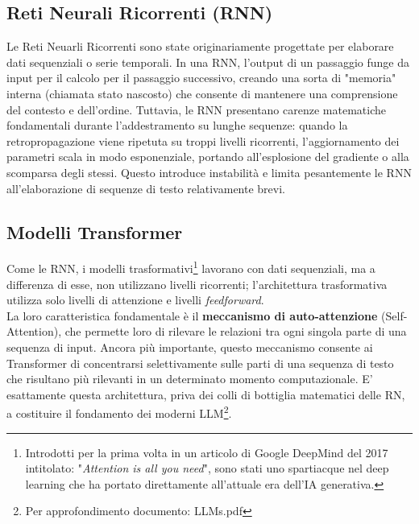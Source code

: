 \documentclass{article}
\begin{document}
\subsection{Reti Neurali Ricorrenti (RNN)}
Le Reti Neuarli Ricorrenti sono state originariamente progettate per elaborare dati sequenziali o serie temporali. In una RNN, l'output di un passaggio funge da input per il calcolo per il passaggio successivo, creando una sorta di "memoria" interna (chiamata stato nascosto) che consente di mantenere una comprensione del contesto e dell'ordine.
Tuttavia, le RNN presentano carenze matematiche fondamentali durante l'addestramento su lunghe sequenze: quando la retropropagazione viene ripetuta su troppi livelli ricorrenti, l'aggiornamento dei parametri scala in modo esponenziale, portando all'esplosione del gradiente o alla scomparsa degli stessi. Questo introduce instabilità e limita pesantemente le RNN all'elaborazione di sequenze di testo relativamente brevi.

\subsection{Modelli Transformer}
Come le RNN, i modelli trasformativi\footnote{Introdotti per la prima volta in un articolo di Google DeepMind del 2017 intitolato: "\textit{Attention is all you need}", sono stati uno spartiacque nel deep learning che ha portato direttamente all'attuale era dell'IA generativa.} lavorano con dati sequenziali, ma a differenza di esse, non utilizzano livelli ricorrenti; l'architettura trasformativa utilizza solo livelli di attenzione e livelli \textit{feedforward}.
\\
La loro caratteristica fondamentale è il \textbf{meccanismo di auto-attenzione} (Self-Attention), che permette loro di rilevare le relazioni tra ogni singola parte di una sequenza di input. Ancora più importante, questo meccanismo consente ai Transformer di concentrarsi selettivamente sulle parti di una sequenza di testo che risultano più rilevanti in un determinato momento computazionale. E' esattamente questa architettura, priva dei colli di bottiglia matematici delle RN, a costituire il fondamento dei moderni LLM\footnote{Per approfondimento documento: LLMs.pdf}.
\end{document}

